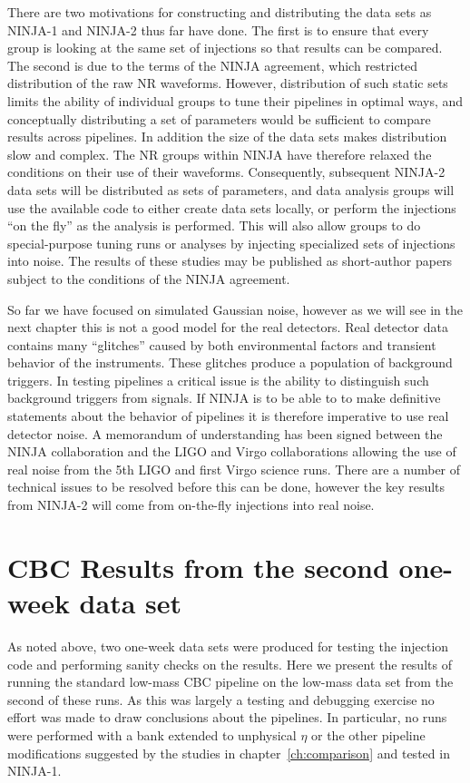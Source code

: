 There are two motivations for constructing and distributing the data
sets as NINJA-1 and NINJA-2 thus far have done.  The first is to
ensure that every group is looking at the same set of injections so
that results can be compared.  The second is due to the terms of the
NINJA agreement, which restricted distribution of the raw NR
waveforms.  However, distribution of such static sets limits the
ability of individual groups to tune their pipelines in optimal ways,
and conceptually distributing a set of parameters would be sufficient
to compare results across pipelines.  In addition the size of the data
sets makes distribution slow and complex.  The NR groups within NINJA
have therefore relaxed the conditions on their use of their waveforms.
Consequently, subsequent NINJA-2 data sets will be distributed as sets
of parameters, and data analysis groups will use the available code to
either create data sets locally, or perform the injections ``on the
fly'' as the analysis is performed.  This will also allow groups to do
special-purpose tuning runs or analyses by injecting specialized 
sets of injections into noise.  The results of these studies may be
published as short-author papers subject to the conditions of the
NINJA agreement.

So far we have focused on simulated Gaussian noise, however as we will
see in the next chapter this is not a good model for the real
detectors.  Real detector data contains many ``glitches'' caused by
both environmental factors and transient behavior of the instruments.
These glitches produce a population of background triggers.  In
testing pipelines a critical issue is the ability to distinguish such
background triggers from signals.  If NINJA is to be able to to make
definitive statements about the behavior of pipelines it is therefore
imperative to use real detector noise.  A memorandum of understanding
has been signed between the NINJA collaboration and the LIGO and Virgo
collaborations allowing the use of real noise from the 5th LIGO and
first Virgo science runs.  There are a number of technical issues to
be resolved before this can be done, however the key results from
NINJA-2 will come from on-the-fly injections into real noise.

\section{CBC Results from the second one-week data set}
\label{sec:ninja2_test_week}

As noted above, two one-week data sets were produced for testing the
injection code and performing sanity checks on the results.  Here we
present the results of running the standard low-mass CBC pipeline on
the low-mass data set from the second of these runs.  As this was
largely a testing and debugging exercise no effort was made to draw
conclusions about the pipelines.  In particular, no runs were
performed with a bank extended to unphysical $\eta$ or the other
pipeline modifications suggested by the studies in
chapter~\ref{ch:comparison} and tested in NINJA-1.

